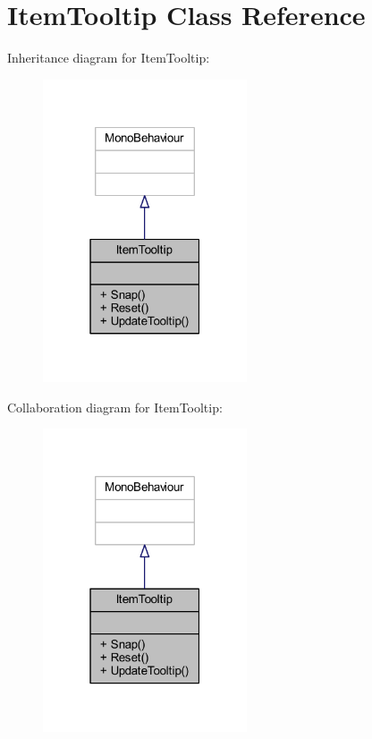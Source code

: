 \hypertarget{class_item_tooltip}{}\section{Item\+Tooltip Class Reference}
\label{class_item_tooltip}


Inheritance diagram for Item\+Tooltip\+:
\nopagebreak
\begin{figure}[H]
\begin{center}
\leavevmode
\includegraphics[width=171pt]{class_item_tooltip__inherit__graph}
\end{center}
\end{figure}


Collaboration diagram for Item\+Tooltip\+:
\nopagebreak
\begin{figure}[H]
\begin{center}
\leavevmode
\includegraphics[width=171pt]{class_item_tooltip__coll__graph}
\end{center}
\end{figure}
